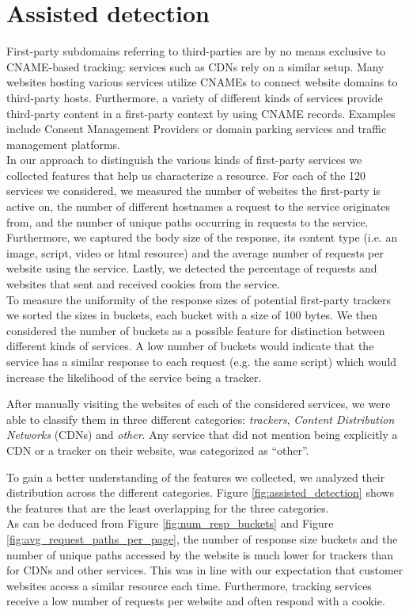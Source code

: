 \section{Assisted detection}
\label{sec:assisted-detection}

First-party subdomains referring to third-parties are by no means exclusive to CNAME-based tracking: 
services such as CDNs rely on a similar setup. Many websites hosting various services utilize CNAMEs to connect website domains to third-party hosts. Furthermore, a variety of different kinds of services provide third-party content in a first-party context by using CNAME records. Examples include  Consent Management Providers or domain parking services and traffic management platforms.\\


In our approach to distinguish the various kinds of first-party services we collected features that 
help us characterize a resource. For each of the 120 services we considered, we measured the number of websites the first-party is active on, the number of different hostnames a request to the service originates from, and the number of unique paths occurring in requests to the service. Furthermore, we captured the body size of the response, 
its content type (i.e. an image, script, video or html resource) and the average number of requests per website using the service. 
Lastly, we detected the percentage of requests and websites that sent and received cookies from the service.\\

To measure the uniformity of the response sizes of potential first-party trackers we sorted the sizes in buckets, each bucket with a size of 100 bytes. We then considered the number of buckets as a possible feature for distinction between different kinds of services. A low number of buckets would indicate that the service has a similar response to each request (e.g. the same script) which would increase the likelihood of the service being a tracker. 

After manually visiting the websites of each of the considered services, we were able to classify them in three different categories: \textit{trackers}, \textit{Content Distribution Networks} (CDNs) and \textit{other}. Any service that did not mention being explicitly a CDN or a tracker on their website, was categorized as ``other''. 


To gain a better understanding of the features we collected, we analyzed their distribution across the different categories. Figure \ref{fig:assisted_detection} shows the features that are the least overlapping for the three categories. \\
As can be deduced from Figure \ref{fig:num_resp_buckets} and Figure \ref{fig:avg_request_paths_per_page}, the number of response size buckets and the number of unique paths accessed by the website is much lower for trackers than for CDNs and other services. This was in line with our expectation that customer websites access a similar resource each time.  Furthermore, tracking services receive a low number of requests per website and often respond with a cookie. \\


